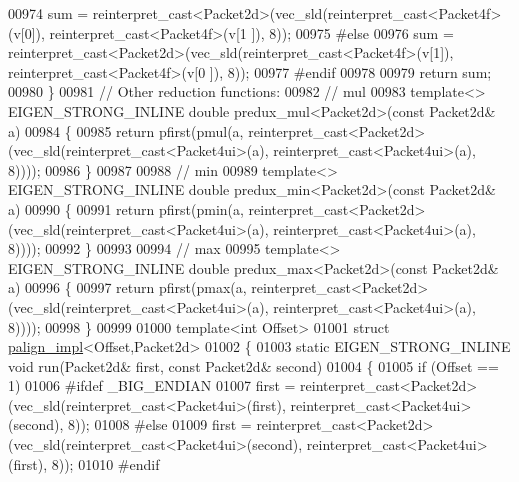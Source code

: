 \begin{DoxyCode}
{00974   sum = \textcolor{keyword}{reinterpret\_cast<}Packet2d\textcolor{keyword}{>}(vec\_sld(reinterpret\_cast<Packet4f>(v[0]), reinterpret\_cast<Packet4f>(v[1
      ]), 8));
00975 \textcolor{preprocessor}{#else}
00976   sum = \textcolor{keyword}{reinterpret\_cast<}Packet2d\textcolor{keyword}{>}(vec\_sld(reinterpret\_cast<Packet4f>(v[1]), reinterpret\_cast<Packet4f>(v[0
      ]), 8));
00977 \textcolor{preprocessor}{#endif}
00978 
00979   \textcolor{keywordflow}{return} sum;
00980 \}
00981 \textcolor{comment}{// Other reduction functions:}
00982 \textcolor{comment}{// mul}
00983 \textcolor{keyword}{template}<> EIGEN\_STRONG\_INLINE \textcolor{keywordtype}{double} predux\_mul<Packet2d>(\textcolor{keyword}{const} Packet2d& a)
00984 \{
00985   \textcolor{keywordflow}{return} pfirst(pmul(a, reinterpret\_cast<Packet2d>(vec\_sld(reinterpret\_cast<Packet4ui>(a), 
      reinterpret\_cast<Packet4ui>(a), 8))));
00986 \}
00987 
00988 \textcolor{comment}{// min}
00989 \textcolor{keyword}{template}<> EIGEN\_STRONG\_INLINE \textcolor{keywordtype}{double} predux\_min<Packet2d>(\textcolor{keyword}{const} Packet2d& a)
00990 \{
00991   \textcolor{keywordflow}{return} pfirst(pmin(a, reinterpret\_cast<Packet2d>(vec\_sld(reinterpret\_cast<Packet4ui>(a), 
      reinterpret\_cast<Packet4ui>(a), 8))));
00992 \}
00993 
00994 \textcolor{comment}{// max}
00995 \textcolor{keyword}{template}<> EIGEN\_STRONG\_INLINE \textcolor{keywordtype}{double} predux\_max<Packet2d>(\textcolor{keyword}{const} Packet2d& a)
00996 \{
00997   \textcolor{keywordflow}{return} pfirst(pmax(a, reinterpret\_cast<Packet2d>(vec\_sld(reinterpret\_cast<Packet4ui>(a), 
      reinterpret\_cast<Packet4ui>(a), 8))));
00998 \}
00999 
01000 \textcolor{keyword}{template}<\textcolor{keywordtype}{int} Offset>
01001 \textcolor{keyword}{struct }\hyperlink{struct_eigen_1_1internal_1_1palign__impl}{palign\_impl}<Offset,Packet2d>
01002 \{
01003   \textcolor{keyword}{static} EIGEN\_STRONG\_INLINE \textcolor{keywordtype}{void} run(Packet2d& first, \textcolor{keyword}{const} Packet2d& second)
01004   \{
01005     \textcolor{keywordflow}{if} (Offset == 1)
01006 \textcolor{preprocessor}{#ifdef \_BIG\_ENDIAN}
01007       first = \textcolor{keyword}{reinterpret\_cast<}Packet2d\textcolor{keyword}{>}(vec\_sld(reinterpret\_cast<Packet4ui>(first), 
      reinterpret\_cast<Packet4ui>(second), 8));
01008 \textcolor{preprocessor}{#else}
01009       first = \textcolor{keyword}{reinterpret\_cast<}Packet2d\textcolor{keyword}{>}(vec\_sld(reinterpret\_cast<Packet4ui>(second), 
      reinterpret\_cast<Packet4ui>(first), 8));
01010 \textcolor{preprocessor}{#endif}
}
\end{DoxyCode}

